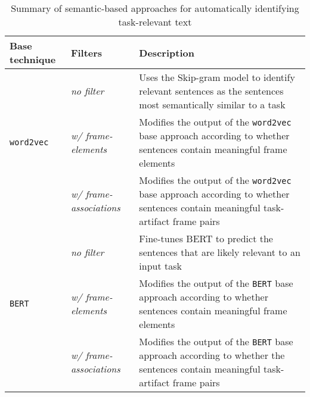 
\begin{table}[H]
\caption{Summary of semantic-based approaches for automatically identifying task-relevant text}
\label{tbl:approaches-summary}
\centering    
\begin{scriptsize}
\begin{threeparttable}
\begin{tabular}{lll}




\textbf{Base technique} & \textbf{Filters} &  \textbf{Description} \\

\hline



& \textit{no filter} &
\parbox[l][1.0cm][c] {8cm}{
    Uses the Skip-gram model to identify relevant sentences as the sentences most semantically similar to a task 
}
\\

\texttt{word2vec} & \textit{w/ frame-elements} &
\parbox[l][1.0cm][c] {8cm}{
    Modifies the output of the \texttt{word2vec} base approach according to whether sentences contain meaningful frame elements
}
\\

    & \textit{w/ frame-associations} &
\parbox[l][1.0cm][c] {8cm}{
    Modifies the output of the \texttt{word2vec} base approach according to whether sentences contain meaningful task-artifact frame pairs
}
\\

\hline

    & \textit{no filter} &
\parbox[l][1.0cm][c] {8cm}{
    Fine-tunes BERT to predict the sentences that are likely relevant to an input task
}
\\

\texttt{BERT} & \textit{w/ frame-elements} &
\parbox[l][1.0cm][c] {8cm}{
    Modifies the output of the \texttt{BERT} base approach according to whether sentences contain meaningful frame elements
}
\\

    & \textit{w/ frame-associations} &
\parbox[l][1.0cm][c] {8cm}{
    Modifies the output of the \texttt{BERT} base approach according to whether the sentences contain meaningful task-artifact frame pairs
}
\\


\hline


\end{tabular}
\end{threeparttable}
\end{scriptsize}
\end{table}

